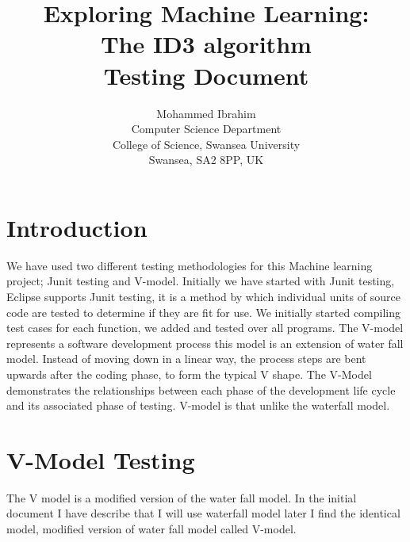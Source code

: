 \documentclass{article}
\begin{document}
\title{Exploring Machine Learning:\\
  The ID3 algorithm\\
  		Testing Document}


\author{Mohammed Ibrahim\\
 Computer Science Department\\
  College of Science, Swansea University\\
  Swansea, SA2 8PP, UK
}
\pagebreak

\maketitle

\pagebreak

\tableofcontents
\pagebreak

\section{Introduction}
\label{sec:intro}


We have used two different testing methodologies for this Machine learning project; Junit testing and V-model. Initially we have started with Junit testing, Eclipse supports Junit testing, it is a method by which individual units of source code are tested to determine if they are fit for use. We initially started compiling test cases for each function, we added and tested over all programs. The V-model represents a software development process this model is an extension of water fall model. Instead of moving down in a linear way, the process steps are bent upwards after the coding phase, to form the typical V shape. The V-Model demonstrates the relationships between each phase of the development life cycle and its associated phase of testing. V-model is that unlike the waterfall model.

\section{V-Model Testing}
 \label{sec:vmod}

The V model is a modified version of the water fall model. In the initial document I have describe that I will use waterfall model later I find the identical model, modified version of water fall model called V-model. 
\end{document}
